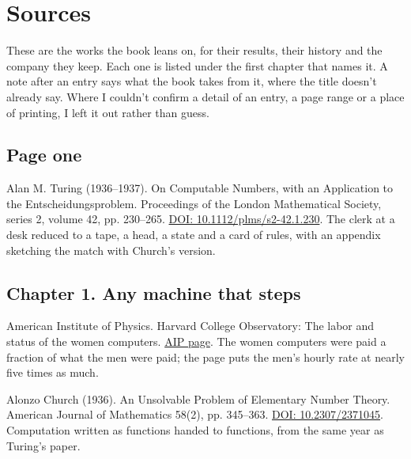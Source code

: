 \section*{Sources}
\label{sec:sources}

These are the works the book leans on, for their results, their history and the company they keep. Each one is listed under the first chapter that names it. A note after an entry says what the book takes from it, where the title doesn't already say. Where I couldn't confirm a detail of an entry, a page range or a place of printing, I left it out rather than guess.

\subsection*{Page one}

\noindent Alan M. Turing (1936--1937). On Computable Numbers, with an Application to the Entscheidungsproblem. Proceedings of the London Mathematical Society, series 2, volume 42, pp. 230--265. \href{https://doi.org/10.1112/plms/s2-42.1.230}{DOI: 10.1112/plms/s2-42.1.230}. The clerk at a desk reduced to a tape, a head, a state and a card of rules, with an appendix sketching the match with Church's version.
\par\medskip

\subsection*{Chapter 1. Any machine that steps}

\noindent American Institute of Physics. Harvard College Observatory: The labor and status of the women computers. \href{https://www.aip.org/history/harvard-observatory/labor-status-women-computers}{AIP page}. The women computers were paid a fraction of what the men were paid; the page puts the men's hourly rate at nearly five times as much.
\par\medskip

\noindent Alonzo Church (1936). An Unsolvable Problem of Elementary Number Theory. American Journal of Mathematics 58(2), pp. 345--363. \href{https://doi.org/10.2307/2371045}{DOI: 10.2307/2371045}. Computation written as functions handed to functions, from the same year as Turing's paper.
\par\medskip

